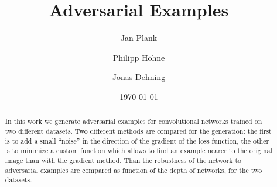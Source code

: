 \documentclass[%
 reprint,
 amsmath,amssymb,
 aps,
]{revtex4-1}
\begin{document}

\title{Adversarial Examples}%

\author{Jan Plank}
\author{Philipp Höhne}%
%


\author{Jonas Dehning}
%

\date{\today}%

\begin{abstract}
In this work we generate adversarial examples for convolutional networks trained on two different datasets. Two different methods are compared for the generation: the first is to add a small ``noise'' in the direction of the gradient of the loss function, the other is to minimize a custom function which allows to find an example nearer to the original image than with the gradient method. Than the robustness of the network to adversarial examples are compared as function of the depth of networks, for the two datasets.


\end{abstract}

\maketitle
\end{document}
